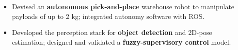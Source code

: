 
    {\begin{itemize}
        \item Devised an \textbf{autonomous pick-and-place} warehouse robot to manipulate payloads of up to 2 kg; integrated autonomy software with ROS.
        \item Developed the perception stack for \textbf{object detection} and 2D-pose estimation; designed and validated a \textbf{fuzzy-supervisory control} model.
    \end{itemize}
}